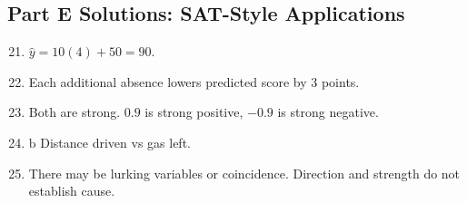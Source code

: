 \documentclass[12pt]{article}
\begin{document}
\subsection*{Part E Solutions: SAT-Style Applications}
\begin{enumerate}
  \setcounter{enumi}{20}
  \item \(\hat{y}=10(4)+50=90\).
  \item Each additional absence lowers predicted score by 3 points.
  \item Both are strong. \(0.9\) is strong positive, \(-0.9\) is strong negative.
  \item \(\boxed{\text{b}}\) Distance driven vs gas left.
  \item There may be lurking variables or coincidence. Direction and strength do not establish cause.
\end{enumerate}
\end{document}

